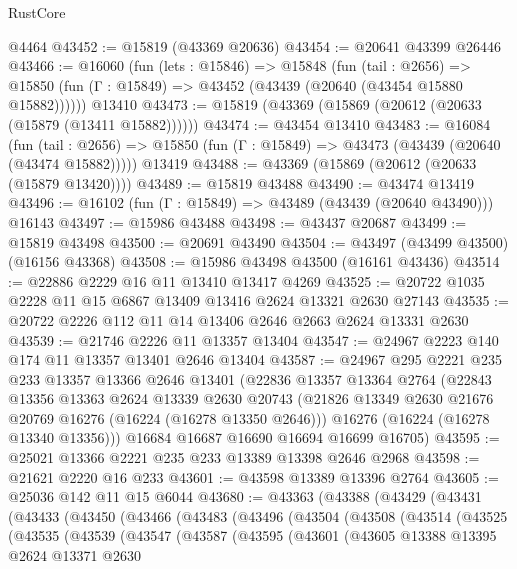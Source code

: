 \begin{lexlean}{RustCore}
\begin{coremodule}
    @4464
@43452 := @15819 (@43369 @20636)
@43454 := @20641 @43399 @26446
@43466 := @16060
    (fun (lets : @15846) =>
    @15848
      (fun (tail : @2656) =>
      @15850 (fun (Γ : @15849) => @43452 (@43439 (@20640 (@43454 @15880 @15882))))))
    @13410
@43473 := @15819 (@43369 (@15869 (@20612 (@20633 (@15879 (@13411 @15882))))))
@43474 := @43454 @13410
@43483 := @16084
    (fun (tail : @2656) => @15850 (fun (Γ : @15849) => @43473 (@43439 (@20640 (@43474 @15882)))))
    @13419
@43488 := @43369 (@15869 (@20612 (@20633 (@15879 @13420))))
@43489 := @15819 @43488
@43490 := @43474 @13419
@43496 := @16102 (fun (Γ : @15849) => @43489 (@43439 (@20640 @43490))) @16143
@43497 := @15986 @43488
@43498 := @43437 @20687
@43499 := @15819 @43498
@43500 := @20691 @43490
@43504 := @43497 (@43499 @43500) (@16156 @43368)
@43508 := @15986 @43498 @43500 (@16161 @43436)
@43514 := @22886 @2229 @16 @11 @13410 @13417 @4269
@43525 := @20722 @1035 @2228 @11 @15 @6867 @13409 @13416 @2624 @13321 @2630 @27143
@43535 := @20722 @2226 @112 @11 @14 @13406 @2646 @2663 @2624 @13331 @2630
@43539 := @21746 @2226 @11 @13357 @13404
@43547 := @24967 @2223 @140 @174 @11 @13357 @13401 @2646 @13404
@43587 := @24967
    @295
    @2221
    @235
    @233
    @13357
    @13366
    @2646
    @13401
    (@22836
      @13357
      @13364
      @2764
      (@22843
        @13356
        @13363
        @2624
        @13339
        @2630
        @20743
        (@21826 @13349 @2630 @21676 @20769 @16276 (@16224 (@16278 @13350 @2646)))
        @16276
        (@16224 (@16278 @13340 @13356)))
      @16684
      @16687
      @16690
      @16694
      @16699
      @16705)
@43595 := @25021 @13366 @2221 @235 @233 @13389 @13398 @2646 @2968
@43598 := @21621 @2220 @16 @233
@43601 := @43598 @13389 @13396 @2764
@43605 := @25036 @142 @11 @15 @6044
@43680 := @43363
    (@43388
      (@43429
        (@43431
          (@43433
            (@43450
              (@43466
                (@43483
                  (@43496
                    (@43504
                      (@43508
                        (@43514
                          (@43525
                            (@43535
                              (@43539
                                (@43547
                                  (@43587
                                    (@43595
                                      (@43601
                                        (@43605
                                          @13388
                                          @13395
                                          @2624
                                          @13371
                                          @2630

\end{coremodule}
\end{lexlean}
